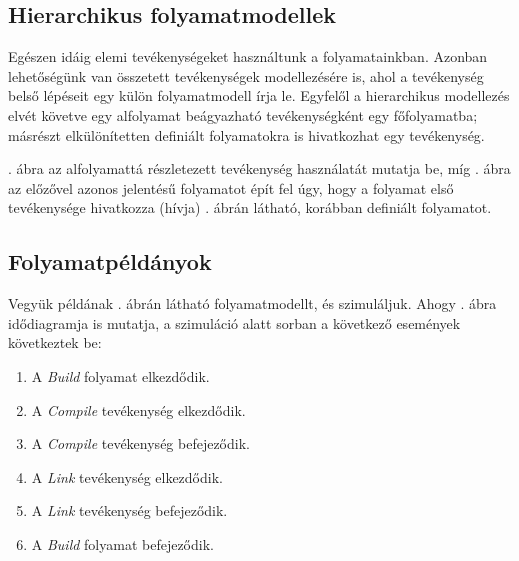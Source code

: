 \subsection{Hierarchikus folyamatmodellek}
Egészen idáig elemi tevékenységeket használtunk a folyamatainkban. Azonban lehetőségünk van összetett tevékenységek modellezésére is, ahol a tevékenység belső lépéseit egy külön folyamatmodell írja le. Egyfelől a hierarchikus modellezés elvét követve egy alfolyamat beágyazható tevékenységként egy főfolyamatba; másrészt elkülönítetten definiált folyamatokra is hivatkozhat egy tevékenység.  

\begin{pelda}

. ábra az alfolyamattá részletezett tevékenység használatát mutatja be, míg . ábra az előzővel azonos jelentésű folyamatot épít fel úgy, hogy a folyamat első tevékenysége hivatkozza (hívja) . ábrán látható, korábban definiált folyamatot.
\end{pelda}




% 
% 
% 
% 


\subsection{Folyamatpéldányok}

\begin{pelda}
Vegyük példának . ábrán látható folyamatmodellt, és szimuláljuk. Ahogy . ábra idődiagramja is mutatja, a szimuláció alatt sorban a következő események következtek be: \begin{enumerate}
  \item A \emph{Build} folyamat elkezdődik.
  \item A \emph{Compile} tevékenység elkezdődik.
  \item A \emph{Compile} tevékenység befejeződik.
  \item A \emph{Link} tevékenység elkezdődik.
  \item A \emph{Link} tevékenység befejeződik.
  \item A \emph{Build} folyamat befejeződik.
\end{enumerate}
\end{pelda}


